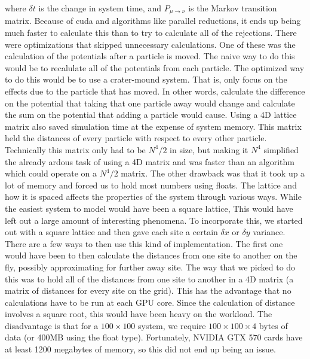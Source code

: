 where $\delta t$ is the change in system time, and $P_{\mu \rightarrow \nu}$ is the Markov transition matrix. Because of {\sc cuda} and algorithms like parallel reductions, it ends up being much faster to calculate this than to try to calculate all of the rejections. There were optimizations that skipped unnecessary calculations. One of these was the calculation of the potentials after a particle is moved. The naive way to do this would be to recalulate all of the potentials from each particle. The optimized way to do this would be to use a crater-mound system. That is, only focus on the effects due to the particle that has moved. In other words, calculate the difference on the potential that taking that one particle away would change and calculate the sum on the potential that adding a particle would cause. Using a 4D lattice matrix also saved simulation time at the expense of system memory. This matrix held the distances of every particle with respect to every other particle. Technically this matrix only had to be $N^4/2$ in size, but making it $N^4$ simplified the already ardous task of using a 4D matrix and was faster than an algorithm which could operate on a $N^4/2$ matrix. The other drawback was that it took up a lot of memory and forced us to hold most numbers using floats. The lattice and how it is spaced affects the properties of the system through various ways. While the easiest system to model would have been a square lattice, This would have left out a large amount of interesting phenomena. To incorporate this, we started out with a square lattice and then gave each site a certain $\delta x$ or $\delta y$ variance. There are a few ways to then use this kind of implementation. The first one would have been to then calculate the distances from one site to another on the fly, possibly approximating for further away site. The way that we picked to do this was to hold all of the distances from one site to another in a 4D matrix (a matrix of distances for every site on the grid). This has the advantage that no calculations have to be run at each GPU core. Since the calculation of distance involves a square root, this would have been heavy on the workload. The disadvantage is that for a $100 \times 100 $ system, we require $100 \times 100 \times 4$ bytes of data (or 400MB using the float type). Fortunately, NVIDIA GTX 570 cards have at least 1200 megabytes of memory, so this did not end up being an issue.

